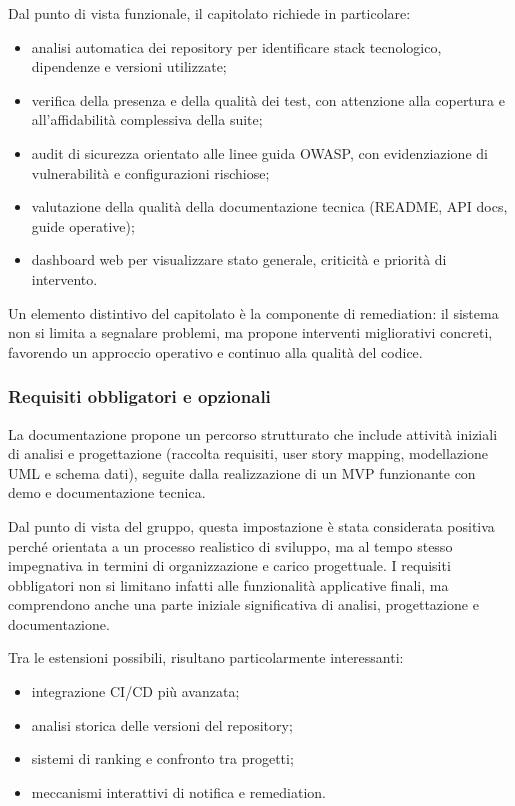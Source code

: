 \documentclass[a4paper,12pt]{article}
\begin{document}
Dal punto di vista funzionale, il capitolato richiede in particolare:

\begin{itemize}
    \item analisi automatica dei repository per identificare stack tecnologico, dipendenze e versioni utilizzate;
    \item verifica della presenza e della qualità dei test, con attenzione alla copertura e all'affidabilità complessiva della suite;
    \item audit di sicurezza orientato alle linee guida OWASP, con evidenziazione di vulnerabilità e configurazioni rischiose;
    \item valutazione della qualità della documentazione tecnica (README, API docs, guide operative);
    \item dashboard web per visualizzare stato generale, criticità e priorità di intervento.
\end{itemize}

Un elemento distintivo del capitolato è la componente di remediation: il sistema non si limita a segnalare problemi, ma propone interventi migliorativi concreti, favorendo un approccio operativo e continuo alla qualità del codice.

\subsubsection{Requisiti obbligatori e opzionali}

La documentazione propone un percorso strutturato che include attività iniziali di analisi e progettazione (raccolta requisiti, user story mapping, modellazione UML e schema dati), seguite dalla realizzazione di un MVP funzionante con demo e documentazione tecnica.

Dal punto di vista del gruppo, questa impostazione è stata considerata positiva perché orientata a un processo realistico di sviluppo, ma al tempo stesso impegnativa in termini di organizzazione e carico progettuale. I requisiti obbligatori non si limitano infatti alle funzionalità applicative finali, ma comprendono anche una parte iniziale significativa di analisi, progettazione e documentazione.

Tra le estensioni possibili, risultano particolarmente interessanti:

\begin{itemize}
    \item integrazione CI/CD più avanzata;
    \item analisi storica delle versioni del repository;
    \item sistemi di ranking e confronto tra progetti;
    \item meccanismi interattivi di notifica e remediation.
\end{itemize}
\end{document}
